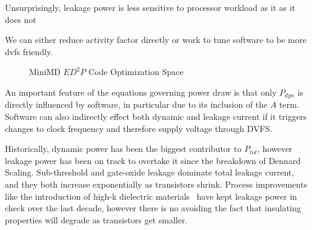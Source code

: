 Unsurprisingly, leakage power is less sensitive to processor workload as it as it does not 


We can either reduce activity factor directly or work to tune software to be more dvfs friendly.




\begin{figure}
\centering

\caption{MiniMD $ED^2P$ Code Optimization Space}
\label{fig:minimd}
\end{figure}




An important feature of the equations governing power draw is that only $P_{dyn}$ is directly influenced by software, in particular due to its inclusion of the $A$ term. Software can also indirectly effect both dynamic and leakage current if it triggers changes to clock frequency and therefore supply voltage through DVFS.  

Historically, dynamic power has been the biggest contributor to $P_{tot}$, however leakage power has been on track to overtake it since the breakdown of Dennard Scaling.  Sub-threshold and gate-oxide leakage dominate total leakage current, and they both increase exponentially as transistors shrink. Process improvements like the introduction of high-k dielectric materials~\cite{jan:2009aa} have kept leakage power in check over the last decade, however there is no avoiding the fact that insulating properties will degrade as transistors get smaller.


